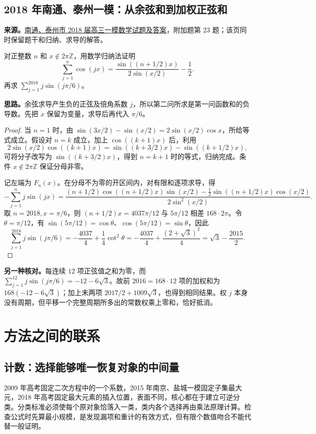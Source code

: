 \documentclass[UTF8,12pt,a4paper,fontset=fandol]{ctexart}
\begin{document}
\subsection{2018 年南通、泰州一模：从余弦和到加权正弦和}\label{sec:c2018nttz1}
\textbf{来源。}\href{https://yn.qinxue100.com/news/gz/20180306/59373.html}{南通、泰州市 2018 届高三一模数学试题及答案}，附加题第 23 题；该页同时保留题干和归纳、求导的解答。
\begin{example}[题意]
对正整数 $n$ 和 $x\notin2\pi\mathbb Z$，用数学归纳法证明
\[
\sum_{j=1}^{n}\cos(jx)=\frac{\sin((n+1/2)x)}{2\sin(x/2)}-\frac12.
\]
再求 $\sum_{j=1}^{2018}j\sin(j\pi/6)$。
\end{example}
\textbf{思路。}余弦求导产生负的正弦及倍角系数 $j$，所以第二问所求是第一问函数和的负导数。先把 $x$ 保留为变量，求导后再代入 $\pi/6$。
\begin{proof}
当 $n=1$ 时，由 $\sin(3x/2)-\sin(x/2)=2\sin(x/2)\cos x$，所给等式成立。假设对 $n=k$ 成立，加上 $\cos((k+1)x)$ 后，利用
\[
2\sin(x/2)\cos((k+1)x)
=\sin((k+3/2)x)-\sin((k+1/2)x),
\]
可将分子改写为 $\sin((k+3/2)x)$，得到 $n=k+1$ 时的等式，归纳完成。条件 $x\notin2\pi\mathbb Z$ 保证分母非零。

记左端为 $F_n(x)$。在分母不为零的开区间内，对有限和逐项求导，得
\[
-\sum_{j=1}^{n}j\sin(jx)
=\frac{(n+1/2)\cos((n+1/2)x)\sin(x/2)
-\tfrac12\sin((n+1/2)x)\cos(x/2)}{2\sin^2(x/2)}.
\]
取 $n=2018,x=\pi/6$，则 $(n+1/2)x=4037\pi/12$ 与 $5\pi/12$ 相差 $168\cdot2\pi$。令 $\theta=\pi/12$，有 $\sin(5\pi/12)=\cos\theta$、$\cos(5\pi/12)=\sin\theta$，因此
\[
\sum_{j=1}^{2018}j\sin(j\pi/6)
=-\frac{4037}{4}+\frac14\cot^2\theta
=-\frac{4037}{4}+\frac{(2+\sqrt3)^2}{4}
=\boxed{\sqrt3-\frac{2015}{2}}.
\]
\end{proof}
\textbf{另一种核对。}每连续 $12$ 项正弦值之和为零，而 $\sum_{j=1}^{12}j\sin(j\pi/6)=-12-6\sqrt3$。故前 $2016=168\cdot12$ 项的加权和为 $168(-12-6\sqrt3)$；加上末两项 $2017/2+1009\sqrt3$，也得到相同结果。权 $j$ 本身没有周期，但平移一个完整周期所多出的常数权乘上零和，恰好抵消。

\section{方法之间的联系}\label{sec:methods}
\subsection{计数：选择能够唯一恢复对象的中间量}
2009 年高考固定二次方程中的一个系数，2015 年南京、盐城一模固定子集最大元，2018 年高考固定最大元素的插入位置，表面不同，核心都在于建立可逆分类。分类标准必须使每个原对象恰落入一类，类内各个选择再由乘法原理计算。检查公式时先算最小规模，是发现漏项和重计的有效方式，但有限个数值吻合不能代替一般证明。
\end{document}
